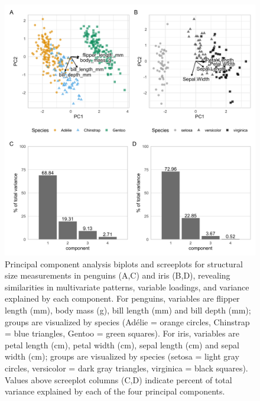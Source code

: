 \begin{Schunk}
\begin{figure}[htbp]

{\centering \includegraphics[width=\textwidth]{figs/pca-1} 

}

\caption[Principal component analysis biplots and screeplots for structural size measurements in penguins (A,C) and iris (B,D), revealing similarities in multivariate patterns, variable loadings, and variance explained by each component]{Principal component analysis biplots and screeplots for structural size measurements in penguins (A,C) and iris (B,D), revealing similarities in multivariate patterns, variable loadings, and variance explained by each component. For penguins, variables are flipper length (mm), body mass (g), bill length (mm) and bill depth (mm); groups are visualized by species (Adélie = orange circles, Chinstrap = blue triangles, Gentoo = green squares). For iris, variables are petal length (cm), petal width (cm), sepal length (cm) and sepal width (cm); groups are visualized by species (setosa = light gray circles, versicolor = dark gray triangles, virginica = black squares). Values above screeplot columns (C,D) indicate percent of total variance explained by each of the four principal components.}\label{fig:pca}
\end{figure}
\end{Schunk}

